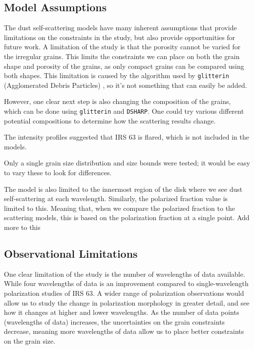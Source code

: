 



\subsection{Model Assumptions}

The dust self-scattering models have many inherent assumptions that provide limitations on the constraints in the study, but also provide opportunities for future work. A limitation of the study is that the porosity cannot be varied for the irregular grains. This limits the constraints we can place on both the grain shape and porosity of the grains, as only compact grains can be compared using both shapes. This limitation is caused by the algorithm used by \texttt{glitterin} (Agglomerated Debris Particles) \citep{glitterin}, so it's not something that can easily be added. 

However, one clear next step is also changing the composition of the grains, which can be done using \texttt{glitterin} and \texttt{DSHARP}. One could try various different potential compositions to determine how the scattering results change. 


The intensity profiles suggested that IRS 63 is flared, which is not included in the models. 


Only a single grain size distribution and size bounds were tested; it would be easy to vary these to look for differences. 



The model is also limited to the innermost region of the disk where we see dust self-scattering at each wavelength. Similarly, the polarized fraction value is limited to this. Meaning that, when we compare the polarized fraction to the scattering models, this is based on the polarization fraction at a single point. Add more to this



\subsection{Observational Limitations}


One clear limitation of the study is the number of wavelengths of data available. While four wavelengths of data is an improvement compared to single-wavelength polarization studies of IRS 63. A wider range of polarization observations would allow us to study the change in polarization morphology in greater detail, and see how it changes at higher and lower wavelengths. As the number of data points (wavelengths of data) increases, the uncertainties on the grain constraints decrease, meaning more wavelengths of data allow us to place better constraints on the grain size. 


